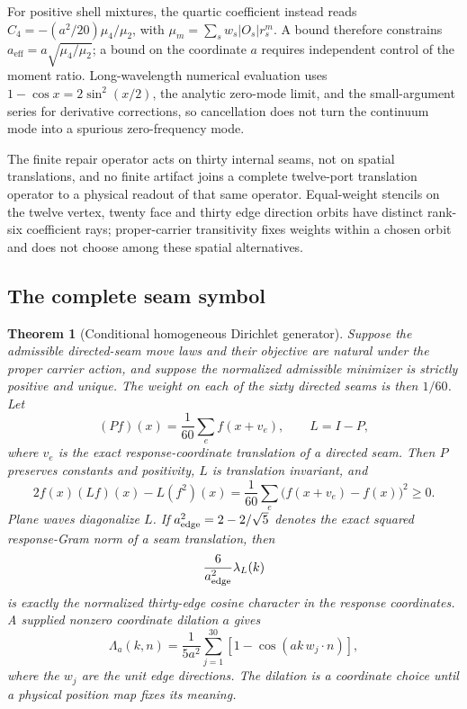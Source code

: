 \documentclass[11pt]{article}
\newtheorem{theorem}{Theorem}[section]
\theoremstyle{remark}
\theoremstyle{plain}
\begin{document}
For positive shell mixtures, the quartic coefficient instead reads
\(C_4=-(a^2/20)\mu_4/\mu_2\), with
\(\mu_m=\sum_s w_s|O_s|r_s^m\). A bound therefore constrains
\(a_{\mathrm{eff}}=a\sqrt{\mu_4/\mu_2}\); a bound on the coordinate \(a\)
requires independent control of the moment ratio. Long-wavelength numerical
evaluation uses \(1-\cos x=2\sin^2(x/2)\), the analytic zero-mode limit,
and the small-argument series for derivative corrections, so cancellation
does not turn the continuum mode into a spurious zero-frequency mode.

The finite repair operator acts on thirty internal seams, not on spatial
translations, and no finite artifact joins a complete twelve-port
translation operator to a physical readout of that same operator.
Equal-weight stencils on the twelve vertex, twenty face and thirty edge
direction orbits have distinct rank-six coefficient rays; proper-carrier
transitivity fixes weights within a chosen orbit and does not choose among
these spatial alternatives.

\subsection{The complete seam symbol}

\begin{theorem}[Conditional homogeneous Dirichlet generator]
\label{thm:seam-current-dirichlet-generator}
Suppose the admissible directed-seam move laws and their objective are natural
under the proper carrier action, and suppose the normalized admissible
minimizer is strictly positive and unique. The weight on each of the sixty
directed seams is then \(1/60\). Let
\[
(Pf)(x)=\frac1{60}\sum_e f(x+v_e),\qquad L=I-P,
\]
where \(v_e\) is the exact response-coordinate translation of a directed seam.
Then \(P\) preserves constants and positivity, \(L\) is translation
invariant, and
\[
2f(x)(Lf)(x)-L(f^2)(x)
=\frac1{60}\sum_e\bigl(f(x+v_e)-f(x)\bigr)^2\ge0.
\]
Plane waves diagonalize \(L\). If \(a_{\rm edge}^2=2-2/\sqrt5\) denotes the
exact squared response-Gram norm of a seam translation, then
\[
\frac6{a_{\rm edge}^2}\lambda_L(k)
\]
is exactly the normalized thirty-edge cosine character in the response
coordinates. A supplied nonzero coordinate dilation \(a\) gives
\begin{equation}
\Lambda_a(k,n)=\frac1{5a^2}\sum_{j=1}^{30}
 \left[1-\cos\!\left(ak\,w_j\mathbin{\cdot}n\right)\right],
\label{eq:screen-seam-current-symbol}
\end{equation}
where the \(w_j\) are the unit edge directions. The dilation is a coordinate
choice until a physical position map fixes its meaning.
\end{theorem}
\end{document}
